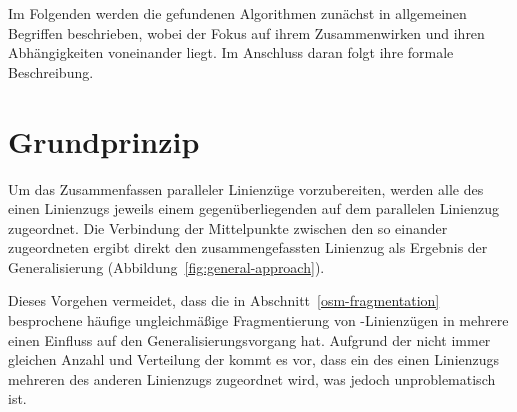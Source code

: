 \documentclass[../main/thesis.tex]{subfiles}
\begin{document}




Im Folgenden werden die gefundenen Algorithmen zunächst in allgemeinen Begriffen beschrieben, wobei der Fokus auf ihrem Zusammenwirken und ihren Abhängigkeiten voneinander liegt.
Im Anschluss daran folgt ihre formale Beschreibung.


\section{Grundprinzip}

Um das Zusammenfassen paralleler Linienzüge vorzubereiten, werden alle  des einen Linienzugs jeweils einem gegenüberliegenden  auf dem parallelen Linienzug zugeordnet.
Die Verbindung der Mittelpunkte zwischen den so einander zugeordneten  ergibt direkt den zusammengefassten Linienzug als Ergebnis der Generalisierung (Abbildung~\ref{fig:general-approach}).

Dieses Vorgehen vermeidet, dass die in Abschnitt~\ref{osm-fragmentation} besprochene häufige ungleichmäßige Fragmentierung von \osm-Linienzügen in mehrere  einen Einfluss auf den Generalisierungsvorgang hat.
Aufgrund der nicht immer gleichen Anzahl und Verteilung der  kommt es vor, dass ein  des einen Linienzugs mehreren  des anderen Linienzugs zugeordnet wird, was jedoch unproblematisch ist.
\end{document}
